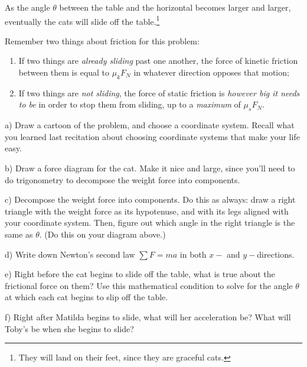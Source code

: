 \documentclass[12pt]{article}
\begin{document}
	As the angle $\theta$ between the table and the horizontal becomes larger and larger, eventually the cats will slide off the 
	table.\footnote{They will land on their feet, since they are graceful cats.}
	
	Remember two things about friction for this problem:
	
	\begin{enumerate}
		\item If two things are {\it already sliding} past one another, the force of kinetic friction between them is equal to $\mu_k F_N$ in whatever direction opposes that motion;
		\item If two things are {\it not sliding}, the force of static friction is {\it however big it needs to be} in order to stop
		them from sliding, up to a {\it maximum} of $\mu_s F_N$.
	\end{enumerate}
	
	a) Draw a cartoon of the problem, and choose a coordinate system. Recall what you learned last recitation about choosing
	coordinate systems that make your life easy.
	\vfill
	
	
	\newpage
	
	b) Draw a force diagram for the cat. Make it nice and large, since you'll need to do trigonometry to decompose the 
	weight force into components.
	
	\vspace{3in}
	
	
	c) Decompose the weight force into components. Do this as always: draw a right triangle with the weight force as its 
	hypotenuse, and with its legs aligned with your coordinate system. Then, figure out which angle in the right triangle
	is the same as $\theta$. (Do this on your diagram above.)
	
	d) Write down Newton's second law $\sum F = ma$ in both $x-$ and $y-$directions. 
	
	\vspace{2in}
	\newpage
	
	e) Right before the cat begins to slide off the table, what is true about the frictional force on them? Use this 
	mathematical condition to solve for the angle $\theta$ at which each cat begins to slip off the table.
	
	\vspace{3in}
	
	f) Right after Matilda begins to slide, what will her acceleration be? What will Toby's be when she begins to slide? 
	
	
\end{document}
